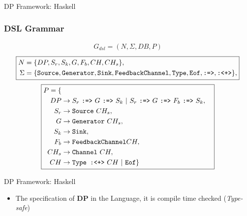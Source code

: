 \documentclass{beamer}
\begin{document}
  \begin{frame}[fragile]{DP Framework: Haskell}
    \frametitle{DSL Grammar}
    \small
    \begin{equation*}
      \boxed{
       \begin{aligned}
      G_{dsl} = (N, \Sigma, DB, P)
      \end{aligned}
      }
  \end{equation*}
  \tiny
      \begin{equation*}
          \boxed{
           \begin{aligned}
          N &= \{DP,S_r,S_k,G,F_b,CH,CH_s\},\\
          \Sigma &= \{\text{\texttt{Source}},\text{\texttt{Generator}},\text{\texttt{Sink}},\text{\texttt{FeedbackChannel}},\text{\texttt{Type}},\text{\texttt{Eof}},\text{\texttt{:=>}},\text{\texttt{:<+>}}\},
          \end{aligned}
          }
      \end{equation*}
    \small
    \begin{equation*}
      \boxed{
        \begin{aligned}
      P = \{\\
      DP  &\rightarrow S_r\ \text{\texttt{:=>}}\ G\ \text{\texttt{:=>}}\ S_k\ |\ S_r\ \text{\texttt{:=>}}\ G\ \text{\texttt{:=>}}\ F_b\ \text{\texttt{:=>}}\ S_k,\\
      S_r &\rightarrow \text{\texttt{Source}}\ CH_s,\\
      G   &\rightarrow \text{\texttt{Generator}}\ CH_s,\\
      S_k &\rightarrow \text{\texttt{Sink}},\\
      F_b &\rightarrow \text{\texttt{FeedbackChannel}} CH,\\
      CH_s &\rightarrow \text{\texttt{Channel}}\ CH,\\
      CH &\rightarrow \text{\texttt{Type :<+>}}\ CH\ |\ \text{\texttt{Eof}}\}
    \end{aligned}
    }
    \end{equation*}
  \end{frame}

  \begin{frame}[fragile]{DP Framework: Haskell}
    \begin{itemize}
      \item The specification of \textbf{DP} in the Language, it is compile time checked (\textit{Type-safe})
    \end{itemize}    
  \end{frame}
\end{document}
